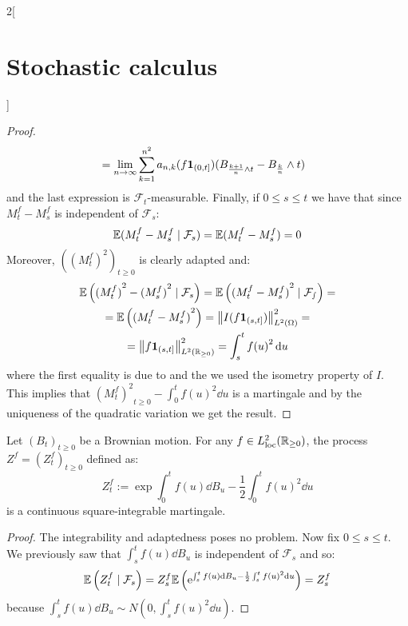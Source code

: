 \documentclass[../../../main_math.tex]{subfiles}
\begin{document}
\begin{multicols}{2}[\section{Stochastic calculus}]
\begin{proof}
\begin{align*}
            & =\lim_{n\to\infty}\sum_{k=1}^{n^2}a_{n,k}(f\boldsymbol{\mathrm{1}}_{(0,t]})(B_{\frac{k+1}{n}\wedge t}-B_{\frac{k}{n}}\wedge t)
    \end{align*}
    and the last expression is $\mathcal{F}_t$-measurable. Finally, if $0\leq s\leq t$ we have that since $M_t^f-M_s^f$ is independent of $\mathcal{F}_s$:
    $$
      \mathbb{E}(M_t^f-M_s^f\mid \mathcal{F}_s)=\mathbb{E}(M_t^f-M_s^f)=0
    $$
    Moreover, $({(M_t^f)}^2)_{t\geq 0}$ is clearly adapted and:
    \begin{multline*}
      \mathbb{E}\left({(M_t^f)}^2-{(M_s^f)}^2\mid \mathcal{F}_s\right)=\mathbb{E}\left({(M_t^f-M_s^f)}^2\mid\mathcal{F_s}\right)=\\=\mathbb{E}\left({(M_t^f-M_s^f)}^2\right)=\left\|I(f\boldsymbol{\mathrm{1}}_{(s,t]})\right\|_{L^2(\Omega)}^2=\\=\left\|f\boldsymbol{\mathrm{1}}_{(s,t]}\right\|_{L^2(\mathbb{R}_{\geq 0})}^2=\int_s^t {f(u)}^2\dd{u}
    \end{multline*}
    where the first equality is due to  and the we used the isometry property of $I$. This implies that ${{(M_t^f)}^2}_{t\geq 0}-\int_0^t{f(u)}^2\dd{u}$ is a martingale and by the uniqueness of the quadratic variation we get the result.
  \end{proof}
  \begin{proposition}
    Let ${(B_t)}_{t\geq 0}$ be a Brownian motion. For any $f\in L_{\text{loc}}^2(\mathbb{R}_{\geq 0})$, the process $Z^f={(Z_t^f)}_{t\geq 0}$ defined as:
    $$
      Z_t^f:=\exp{\int_0^t f(u)\dd{B_u}-\frac{1}{2}\int_0^t{f(u)}^2\dd{u}}
    $$
    is a continuous square-integrable martingale.
  \end{proposition}
  \begin{proof}
    The integrability and adaptedness poses no problem. Now fix $0\leq s\leq t$. We previously saw that $\int_s^t f(u)\dd{B_u}$ is independent of $\mathcal{F}_s$ and so:
    $$
      \mathbb{E}\left(Z_t^f\mid \mathcal{F}_s\right)=Z_s^f\mathbb{E}\left(\mathrm{e}^{\int_s^t f(u)\dd{B_u}-\frac{1}{2}\int_s^t{f(u)}^2\dd{u}}\right)=Z_s^f
    $$
    because $\int_s^t f(u)\dd{B_u}\sim N(0,\int_s^t{f(u)}^2\dd{u})$.
  \end{proof}

\end{multicols}
\end{document}
